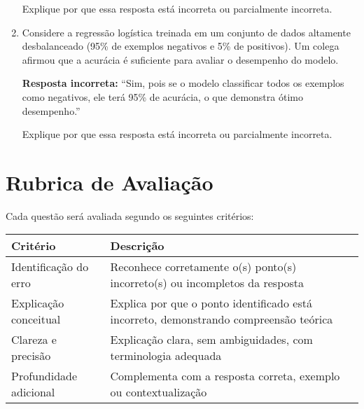 \documentclass[12pt]{article}
\begin{document}
\begin{enumerate}
    Explique por que essa resposta está incorreta ou parcialmente incorreta.  

    \item Considere a regressão logística treinada em um conjunto de dados altamente desbalanceado (95\% de exemplos negativos e 5\% de positivos).  
    Um colega afirmou que a acurácia é suficiente para avaliar o desempenho do modelo.  

    \textbf{Resposta incorreta:}  
    “Sim, pois se o modelo classificar todos os exemplos como negativos, ele terá 95\% de acurácia, o que demonstra ótimo desempenho.”  

    Explique por que essa resposta está incorreta ou parcialmente incorreta.  



\end{enumerate}

\vspace{1cm}
\section*{Rubrica de Avaliação}
Cada questão será avaliada segundo os seguintes critérios:

\begin{center}
\begin{tabular}{p{4.5cm}p{10cm}}
\toprule
\textbf{Critério} & \textbf{Descrição}  \\
\midrule
Identificação do erro & Reconhece corretamente o(s) ponto(s) incorreto(s) ou incompletos da resposta \\
Explicação conceitual & Explica por que o ponto identificado está incorreto, demonstrando compreensão teórica \\
Clareza e precisão & Explicação clara, sem ambiguidades, com terminologia adequada \\
Profundidade adicional & Complementa com a resposta correta, exemplo ou contextualização \\
\midrule
\bottomrule
\end{tabular}
\end{center}
\end{document}
